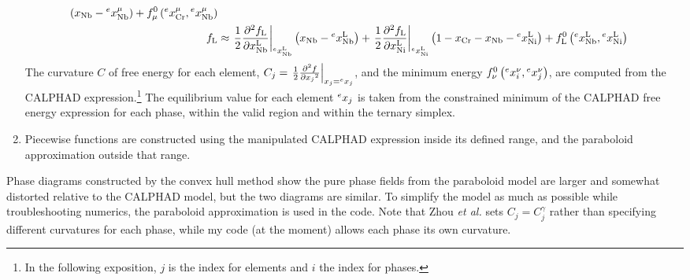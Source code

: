 \documentclass[10pt]{article}
\begin{document}
\begin{enumerate}
\begin{align}
			                          \left(x_{\ce{Nb}} - \prescript{e}{}{x}_{\ce{Nb}}^{\mu}\right)
			                        + f^0_{\mu}\left(\prescript{e}{}{x}_{\ce{Cr}}^{\mu}, \prescript{e}{}{x}_{\ce{Nb}}^{\mu}\right)\\ 
			      f_{\ce{L}} &\approx \left.\frac{1}{2}\frac{\partial^2 f_{\ce{L}}}{\partial x_{\ce{Nb}}^{\ce{L}}}\right|_{\prescript{e}{}{x}_{\ce{Nb}}^{\ce{L}}}
			                          \left(x_{\ce{Nb}} - \prescript{e}{}{x}_{\ce{Nb}}^{\ce{L}}\right)
			                        + \left.\frac{1}{2}\frac{\partial^2 f_{\ce{L}}}{\partial x_{\ce{Ni}}^{\ce{L}}}\right|_{\prescript{e}{}{x}_{\ce{Ni}}^{\ce{L}}}
			                          \left(1-x_{\ce{Cr}}-x_{\ce{Nb}} - \prescript{e}{}{x}_{\ce{Ni}}^{\ce{L}}\right)
			                        + f^0_{\ce{L}}\left(\prescript{e}{}{x}_{\ce{Nb}}^{\ce{L}}, \prescript{e}{}{x}_{\ce{Ni}}^{\ce{L}}\right)
			      \end{align}
			      The curvature $C$ of free energy for each element,
			      $C_j=\left.\frac{1}{2}\frac{\partial^2 f}{\partial {x_j}^2}\right|_{x_j=\prescript{e}{}{x}_j}$,
			      and the minimum energy $f^0_{\nu}\left(\prescript{e}{}{x}_{i}^{\nu}, \prescript{e}{}{x}_{j}^{\nu}\right)$,
			      are computed from the CALPHAD expression.\footnote{In the following exposition, $j$ is the index for elements and $i$ the index for phases.
	              }
			      The equilibrium value for each element $\prescript{e}{}{x}_j$ is taken from the constrained minimum
			      of the CALPHAD free energy expression for each phase, within the valid region and within the ternary simplex.
			\item Piecewise functions are constructed using the manipulated CALPHAD expression inside its defined range,
			      and the paraboloid approximation outside that range.
		\end{enumerate}
		Phase diagrams constructed by the convex hull method show the pure phase fields from the paraboloid model are larger
		and somewhat distorted relative to the CALPHAD model, but the two diagrams are similar.
		To simplify the model as much as possible while troubleshooting numerics, the paraboloid approximation is used in the code.
		Note that Zhou \emph{et al.} \cite{Zhou2014} sets $C_j=C_j^{\gamma}$ rather than specifying different curvatures for each phase,
		while my code (at the moment) allows each phase its own curvature.
	



	\newpage
\end{document}
